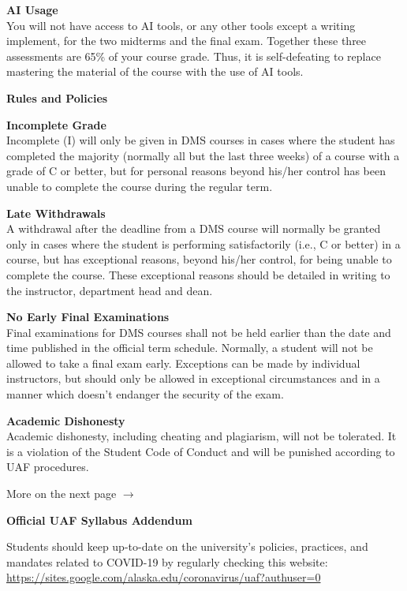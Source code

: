 \documentclass[12pt]{article}
\renewcommand{\emph}[1]{\textsf{\textbf{#1}}}
\newcommand{\localhead}[1]{\par\smallskip\textbf{#1} \smallskip\nobreak\\}%
\def\heading#1{\localhead{\large\emph{#1}}}
\def\subheading#1{\localhead{\emph{#1}}}
\begin{document}
\heading{AI Usage}
You will not have access to AI tools, or any other tools except a writing implement, for the two midterms and the final exam. Together these three assessments are 65\% of your course grade. Thus, it is self-defeating to replace mastering the material of the course with the use of AI tools.

\heading{Rules and Policies}
\vskip -20pt
\subheading{Incomplete Grade} 
Incomplete (I) will only be given in
  DMS courses in cases where
  the student has completed the majority (normally all but the last
  three weeks) of a course with a grade of C or better, but for
  personal reasons beyond his/her control has been unable to complete
  the course during the regular term.  

\subheading{Late Withdrawals} 
A withdrawal after the deadline from a DMS course will
  normally be granted only in cases where the student is performing
  satisfactorily (i.e., C or better) in a course, but has exceptional
  reasons, beyond his/her control, for being unable to complete the
  course. These exceptional reasons should be detailed in writing to
  the instructor, department head and dean.

\subheading{No Early Final Examinations}
Final examinations for DMS
  courses shall not be held earlier than the date and time published
  in the official term schedule. Normally, a student will not be
  allowed to take a final exam early. Exceptions can be made by
  individual instructors, but should only be allowed in exceptional
  circumstances and in a manner which doesn't endanger the security of
  the exam.

\subheading{Academic Dishonesty}
Academic dishonesty, including cheating and plagiarism, will not
be tolerated.  It is a violation of the Student Code of Conduct
and will be punished according to UAF procedures.

\vfill

{\Large{More on the next page $\longrightarrow$}}

\newpage

\begin{center}
\textbf{\large{Official UAF Syllabus Addendum}}
\end{center}

 Students should keep up-to-date on the university's policies, practices, and mandates related to COVID-19 by regularly checking this website: \url{https://sites.google.com/alaska.edu/coronavirus/uaf?authuser=0}
\end{document}
